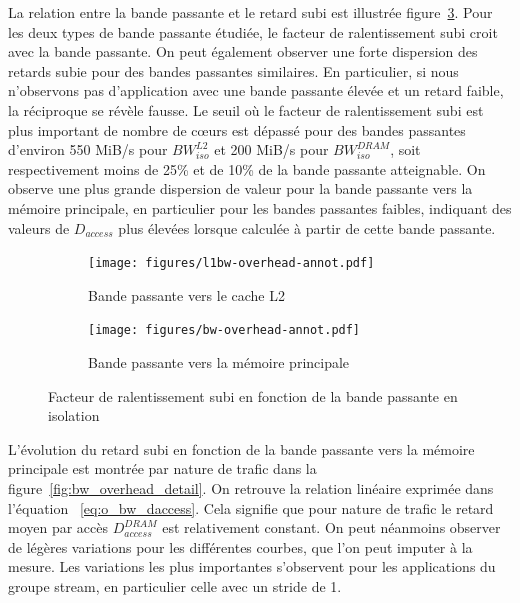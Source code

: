 La relation entre la bande passante et le retard subi est illustrée figure~\ref{fig:bw_overhead}.
Pour les deux types de bande passante étudiée, le facteur de ralentissement subi croit avec la bande passante.
On peut également observer une forte dispersion des retards subie pour des bandes passantes similaires.
En particulier, si nous n'observons pas d'application avec une bande passante élevée et un retard faible, la réciproque se révèle fausse.
Le seuil où le facteur de ralentissement subi est plus important de nombre de cœurs est dépassé pour des bandes passantes d'environ 550 MiB/s pour $BW_{iso}^{L2}$ et 200 MiB/s pour $BW_{iso}^{DRAM}$, soit respectivement moins de 25\% et de 10\% de la bande passante atteignable.
On observe une plus grande dispersion de valeur pour la bande passante vers la mémoire principale, en particulier pour les bandes passantes faibles, indiquant des valeurs de $D_{access}$ plus élevées lorsque calculée à partir de cette bande passante.

\begin{figure}[h!]
	\begin{subfigure}[t]{0,48\linewidth}
		\texttt{[image: figures/l1bw-overhead-annot.pdf]}
		\caption{\label{fig:dist_bw_daccess}Bande passante vers le cache L2}
	\end{subfigure}
	\begin{subfigure}[t]{0,48\linewidth}
		\texttt{[image: figures/bw-overhead-annot.pdf]}
		\caption{\label{fig:dist_access_daccess}Bande passante vers la mémoire principale}
	\end{subfigure}
	\caption{\label{fig:bw_overhead}Facteur de ralentissement subi en fonction de la bande passante en isolation}
\end{figure}

L'évolution du retard subi en fonction de la bande passante vers la mémoire principale est montrée par nature de trafic dans la figure~\ref{fig:bw_overhead_detail}.
On retrouve la relation linéaire exprimée dans l'équation ~\ref{eq:o_bw_daccess}.
Cela signifie que pour nature de trafic le retard moyen par accès $D_{access}^{DRAM}$ est relativement constant.
On peut néanmoins observer de légères variations pour les différentes courbes, que l'on peut imputer à la mesure.
Les variations les plus importantes s'observent pour les applications du groupe stream, en particulier celle avec un stride de 1.

